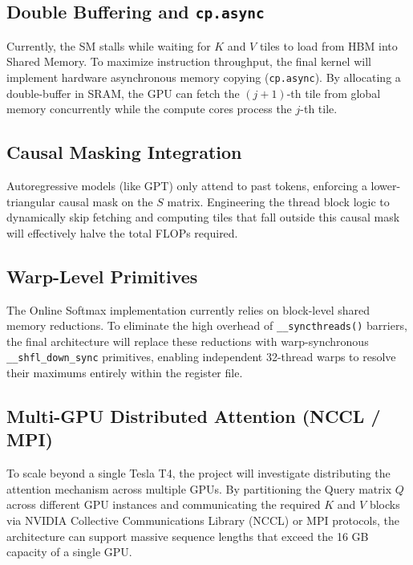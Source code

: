 \documentclass[12pt]{article}
\begin{document}
\subsection{Double Buffering and \texttt{cp.async}}
Currently, the SM stalls while waiting for $K$ and $V$ tiles to load from HBM into Shared Memory. To maximize instruction throughput, the final kernel will implement hardware asynchronous memory copying (\texttt{cp.async}). By allocating a double-buffer in SRAM, the GPU can fetch the $(j+1)$-th tile from global memory concurrently while the compute cores process the $j$-th tile.

\subsection{Causal Masking Integration}
Autoregressive models (like GPT) only attend to past tokens, enforcing a lower-triangular causal mask on the $S$ matrix. Engineering the thread block logic to dynamically skip fetching and computing tiles that fall outside this causal mask will effectively halve the total FLOPs required.

\subsection{Warp-Level Primitives}
The Online Softmax implementation currently relies on block-level shared memory reductions. To eliminate the high overhead of \texttt{\_\_syncthreads()} barriers, the final architecture will replace these reductions with warp-synchronous \texttt{\_\_shfl\_down\_sync} primitives, enabling independent 32-thread warps to resolve their maximums entirely within the register file.

\subsection{Multi-GPU Distributed Attention (NCCL / MPI)}
To scale beyond a single Tesla T4, the project will investigate distributing the attention mechanism across multiple GPUs. By partitioning the Query matrix $Q$ across different GPU instances and communicating the required $K$ and $V$ blocks via NVIDIA Collective Communications Library (NCCL) or MPI protocols, the architecture can support massive sequence lengths that exceed the 16 GB capacity of a single GPU.
\end{document}
